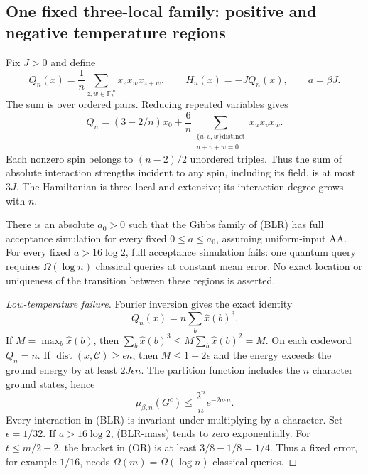 \subsection{One fixed three-local family: positive and negative temperature regions}
\label{res:dense}

Fix $J>0$ and define
\[
 Q_n(x)=\frac1n\sum_{z,w\in\mathbb F_2^m}x_zx_wx_{z+w},
 \qquad H_n(x)=-JQ_n(x),\qquad a=\beta J.
 \tag{BLR}
\]
The sum is over ordered pairs.  Reducing repeated variables gives
\[
 Q_n=(3-2/n)x_0+
 \frac6n\sum_{\substack{\{u,v,w\}\text{distinct}\\u+v+w=0}}x_ux_vx_w.
 \tag{BLR-local}
\]
Each nonzero spin belongs to $(n-2)/2$ unordered triples.  Thus the
sum of absolute interaction strengths incident to any spin, including
its field, is at most $3J$.  The Hamiltonian is three-local and
extensive; its interaction degree grows with $n$.

\begin{theorem}
\label{res:dense-theorem}
There is an absolute $a_0>0$ such that the Gibbs family of (BLR) has
full acceptance simulation for every fixed $0\le a\le a_0$, assuming
uniform-input AA.  For every fixed $a>16\log2$, full acceptance
simulation fails: one quantum query requires $\Omega(\log n)$
classical queries at constant mean error.  No exact location or
uniqueness of the transition between these regions is asserted.
\end{theorem}

\begin{proof}[Low-temperature failure]
Fourier inversion gives the exact identity
\[
 Q_n(x)=n\sum_b\widehat x(b)^3.
\]
If $M=\max_b\widehat x(b)$, then
$\sum_b\widehat x(b)^3\le M\sum_b\widehat x(b)^2=M$.
On each codeword $Q_n=n$.  If
$\operatorname{dist}(x,\mathcal C)\ge\epsilon n$, then
$M\le1-2\epsilon$ and the energy exceeds the ground energy by at
least $2J\epsilon n$.  The partition function includes the $n$
character ground states, hence
\[
 \mu_{\beta,n}(G^c)
 \le \frac{2^n}{n}e^{-2a\epsilon n}.
 \tag{BLR-mass}
\]
Every interaction in (BLR) is invariant under multiplying by a
character.  Set $\epsilon=1/32$.  If $a>16\log2$, (BLR-mass) tends
to zero exponentially.  For $t\le m/2-2$, the bracket in (OR) is at
least $3/8-1/8=1/4$.  Thus a fixed error, for example $1/16$, needs
$\Omega(m)=\Omega(\log n)$ classical queries.
\end{proof}

